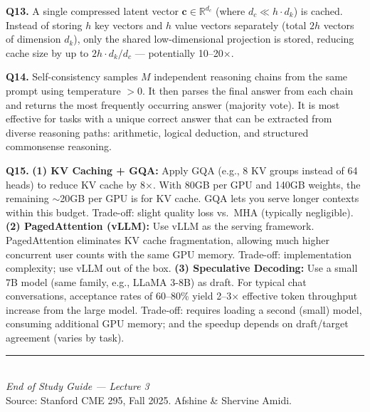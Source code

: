 \documentclass[11pt, a4paper]{article}
\begin{document}
\textbf{Q13.} A single compressed latent vector $\mathbf{c} \in \mathbb{R}^{d_c}$ (where $d_c \ll h \cdot d_k$) is cached. Instead of storing $h$ key vectors and $h$ value vectors separately (total $2h$ vectors of dimension $d_k$), only the shared low-dimensional projection is stored, reducing cache size by up to $2h \cdot d_k / d_c$ --- potentially 10--20$\times$.

\textbf{Q14.} Self-consistency samples $M$ independent reasoning chains from the same prompt using temperature $> 0$. It then parses the final answer from each chain and returns the most frequently occurring answer (majority vote). It is most effective for tasks with a unique correct answer that can be extracted from diverse reasoning paths: arithmetic, logical deduction, and structured commonsense reasoning.

\textbf{Q15.} \textbf{(1) KV Caching + GQA:} Apply GQA (e.g., 8 KV groups instead of 64 heads) to reduce KV cache by 8$\times$. With 80GB per GPU and 140GB weights, the remaining $\sim$20GB per GPU is for KV cache. GQA lets you serve longer contexts within this budget. Trade-off: slight quality loss vs.\ MHA (typically negligible). \textbf{(2) PagedAttention (vLLM):} Use vLLM as the serving framework. PagedAttention eliminates KV cache fragmentation, allowing much higher concurrent user counts with the same GPU memory. Trade-off: implementation complexity; use vLLM out of the box. \textbf{(3) Speculative Decoding:} Use a small 7B model (same family, e.g., LLaMA 3-8B) as draft. For typical chat conversations, acceptance rates of 60--80\% yield 2--3$\times$ effective token throughput increase from the large model. Trade-off: requires loading a second (small) model, consuming additional GPU memory; and the speedup depends on draft/target agreement (varies by task).

\vspace{1em}
\begin{center}
\rule{0.5\textwidth}{0.4pt}\\[6pt]
{\small\textit{End of Study Guide --- Lecture 3}}\\[4pt]
{\small Source: Stanford CME 295, Fall 2025. Afshine \& Shervine Amidi.}
\end{center}
\end{document}
